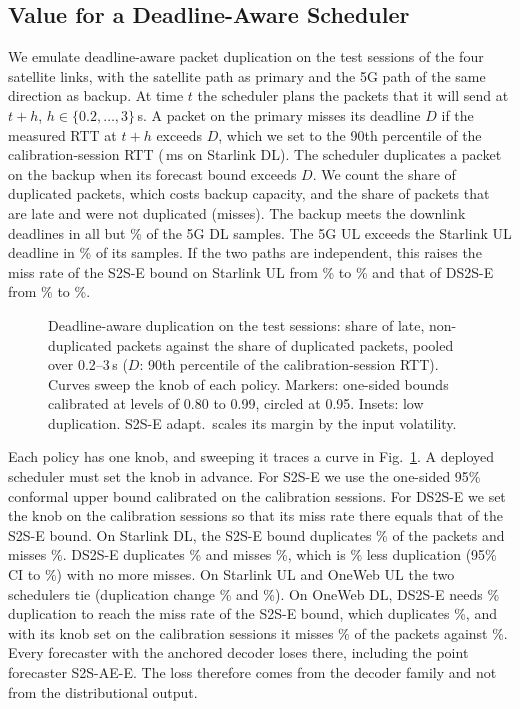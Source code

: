 \subsection{Value for a Deadline-Aware Scheduler}
We emulate deadline-aware packet duplication on the test sessions of the four satellite links, with the satellite path as primary and the 5G path of the same direction as backup. At time $t$ the scheduler plans the packets that it will send at $t+h$, $h\in\{0.2,\dots,3\}$\,s. A packet on the primary misses its deadline $D$ if the measured RTT at $t+h$ exceeds $D$, which we set to the 90th percentile of the calibration-session RTT (\SchedDSLDL\,ms on Starlink DL). The scheduler duplicates a packet on the backup when its forecast bound exceeds $D$. We count the share of duplicated packets, which costs backup capacity, and the share of packets that are late and were not duplicated (misses). The backup meets the downlink deadlines in all but \BackupDLmax\% of the 5G DL samples. The 5G UL exceeds the Starlink UL deadline in \BackupQULSL\% of its samples. If the two paths are independent, this raises the miss rate of the S2S-E bound on Starlink UL from \BackupSSmissSLUL\% to \BackupSSmissCorrSLUL\% and that of DS2S-E from \BackupDSmissSLUL\% to \BackupDSmissCorrSLUL\%.

\begin{figure}[t]
  \centering
  \resizebox{\textwidth}{!}{}
  \caption{Deadline-aware duplication on the test sessions: share of late, non-duplicated packets against the share of duplicated packets, pooled over 0.2--3\,s ($D$: 90th percentile of the calibration-session RTT). Curves sweep the knob of each policy. Markers: one-sided bounds calibrated at levels of 0.80 to 0.99, circled at 0.95. Insets: low duplication. S2S-E adapt.\ scales its margin by the input volatility.}
  \label{fig:sched}
\end{figure}

Each policy has one knob, and sweeping it traces a curve in Fig.~\ref{fig:sched}. A deployed scheduler must set the knob in advance. For S2S-E we use the one-sided 95\% conformal upper bound calibrated on the calibration sessions. For DS2S-E we set the knob on the calibration sessions so that its miss rate there equals that of the S2S-E bound. On Starlink DL, the S2S-E bound duplicates \SchedSSdupSLDL\% of the packets and misses \SchedSSmissSLDL\%. DS2S-E duplicates \SchedDSdupSLDL\% and misses \SchedDSmissSLDL\%, which is \SchedSaveSLDL\% less duplication (95\% CI \SchedSaveSLDLlo{} to \SchedSaveSLDLhi\%) with no more misses. On Starlink UL and OneWeb UL the two schedulers tie (duplication change \SchedSaveSLUL\% and \SchedSaveOWUL\%). On OneWeb DL, DS2S-E needs \SchedDSdupCurveOWDL\% duplication to reach the miss rate of the S2S-E bound, which duplicates \SchedSSdupOWDL\%, and with its knob set on the calibration sessions it misses \SchedDSmissOWDL\% of the packets against \SchedSSmissOWDL\%. Every forecaster with the anchored decoder loses there, including the point forecaster S2S-AE-E. The loss therefore comes from the decoder family and not from the distributional output.

